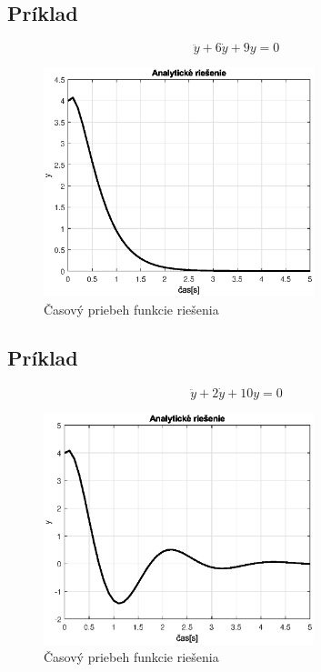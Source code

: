 \documentclass[a4paper,10pt]{article}
\begin{document}
\pagebreak

\subsection{Príklad}

\begin{equation*}
\ddot{y}+6\dot{y}+9y=0
\end{equation*}

\begin{figure}[ht]
\centering
\includegraphics[width=0.7\textwidth]{graf_2} 
\caption{Časový priebeh funkcie riešenia}
\end{figure}

\pagebreak

\subsection{Príklad}

\begin{equation*}
\ddot{y}+2\dot{y}+10y=0
\end{equation*}

\begin{figure}[ht]
\centering
\includegraphics[width=0.7\textwidth]{graf_3} 
\caption{Časový priebeh funkcie riešenia}
\end{figure}
\end{document}
